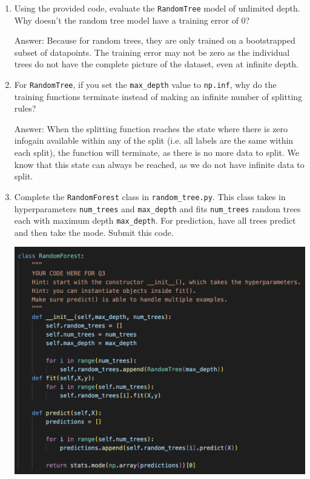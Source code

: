 \documentclass{article}
\def\ans#1{\par\gre{Answer: #1}}
\def\blu#1{{\color{blu}#1}}
\def\gre#1{{\color{gre}#1}}
\let\ask\blu
\begin{document}
   \begin{enumerate}
        \item Using the provided code, evaluate the \texttt{RandomTree} model of unlimited depth. \ask{Why doesn't the random tree model have a training error of 0?}
        \ans{Because for random trees, they are only trained on a bootstrapped subset of datapoints. The training error may not be zero as the individual trees do not have the complete picture of the dataset, even at infinite depth.}
        \item For \texttt{RandomTree}, if you set the \texttt{max\_depth} value to \texttt{np.inf}, \ask{why do the training functions terminate instead of making an infinite number of splitting rules?}
        \ans{When the splitting function reaches the state where there is zero infogain available within any of the split (i.e. all labels are the same within each split), the function will terminate, as there is no more data to split. We know that this state can always be reached, as we do not have infinite data to split.}
        \item Complete the \texttt{RandomForest} class in \texttt{random\string_tree.py}. This class takes in hyperparameters \texttt{num\string_trees} and \texttt{max\string_depth} and
        fits \texttt{num\string_trees} random trees each with maximum depth \texttt{max\string_depth}. For prediction, have all trees predict and then take the mode. \ask{Submit this code.} 
        \begin{center}
            \includegraphics[width=400pt]{3.3.png}
        \end{center}

\end{enumerate}
\end{document}
